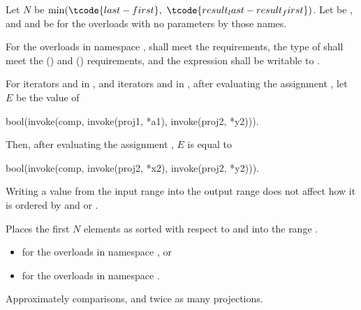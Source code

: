 \begin{itemdescr}
\pnum
Let $N$ be $\min(\tcode{last - first}, \ \tcode{result_last - result_first})$.
Let  be , and
 and  be 
for the overloads with no parameters by those names.

\pnum
\requires
For the overloads in namespace ,
 shall meet
the  requirements,
the type of  shall meet
the  () and
 () requirements,
and the expression 
shall be writable to .

\pnum
\expects
For iterators  and  in , and
iterators  and  in ,
after evaluating the assignment , let $E$ be the value of
\begin{codeblock}
bool(invoke(comp, invoke(proj1, *a1), invoke(proj2, *y2))).
\end{codeblock}
Then, after evaluating the assignment , $E$ is equal to
\begin{codeblock}
bool(invoke(comp, invoke(proj2, *x2), invoke(proj2, *y2))).
\end{codeblock}
\begin{note}
Writing a value from the input range into the output range does not affect
how it is ordered by  and  or .
\end{note}

\pnum
\effects
Places the first $N$ elements
as sorted with respect to  and 
into the range .

\pnum
\returns
\begin{itemize}
\item
   for the overloads in namespace , or
\item
   for
  the overloads in namespace .
\end{itemize}

\pnum
\complexity
Approximately  comparisons,
and twice as many projections.
\end{itemdescr}

